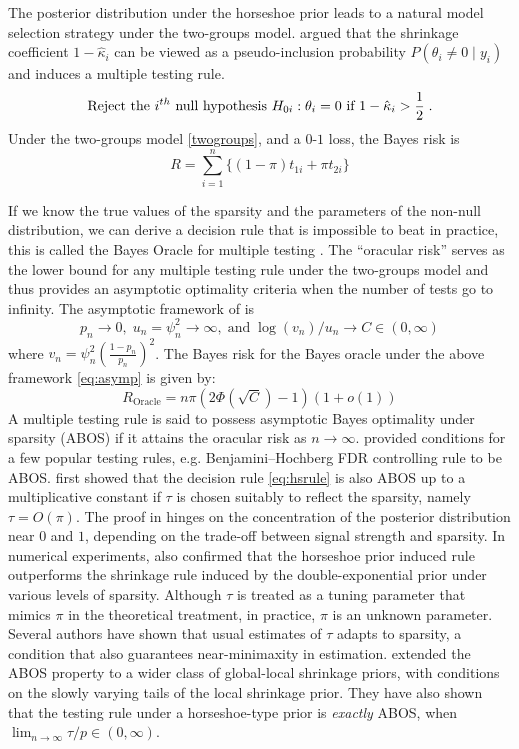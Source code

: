 \documentclass[11pt]{article}
\begin{document}
The posterior distribution under the horseshoe prior leads to a natural model
selection strategy under the two-groups model. \citet{carvalho2010horseshoe}
argued that the shrinkage coefficient $1-\hat{\kappa}_i$ can be viewed as
a pseudo-inclusion probability $P(\theta_i \ne 0 \mid y_i)$ and induces a
multiple testing rule.
\begin{equation}
  \text{Reject the $i^{th}$ null hypothesis } H_{0i} : \theta_i = 0 \text{ if }
  1-\hat{\kappa}_i > \frac{1}{2} \;. 
  \label{eq:hsrule}
\end{equation}
Under the two-groups model \eqref{twogroups}, and a $0$-$1$ loss, the Bayes risk is 
\[
R = \sum_{i=1}^{n} \{ (1- \pi) t_{1i} + \pi t_{2i} \}
\]

If we know the true values of the sparsity and the parameters of the non-null
distribution, we can derive a decision rule that is impossible to beat in
practice, this is called the Bayes Oracle for multiple testing
\citep{bogdan2011asymptotic}. The ``oracular risk'' serves as the lower bound
for any multiple testing rule under the two-groups model and thus provides an
asymptotic optimality criteria when the number of tests go to infinity. The
asymptotic framework of \citet{bogdan2011asymptotic} is 
\begin{equation}
p_n \to 0, \; u_n = \psi_n^2 \to \infty, \; \text{and} \; \log(v_n)/u_n \to C \in (0,\infty) \label{eq:asymp}
\end{equation}
where $v_n = \psi_n^2 (\frac{1-p_n}{p_n})^2$. The Bayes risk for the Bayes oracle under the above framework \eqref{eq:asymp} is given by:
\[
R_{\text{Oracle}} = n \pi (2 \Phi(\sqrt{C}) - 1)(1+o(1))
\]
A multiple testing rule is said to possess asymptotic Bayes optimality under
sparsity (ABOS) if it attains the oracular risk as $n \to \infty$.
\citet{bogdan2011asymptotic} provided conditions for a few popular testing
rules, e.g. Benjamini--Hochberg FDR controlling rule to be ABOS.
\citet{datta2013asymptotic} first showed that the decision rule
\eqref{eq:hsrule} is also ABOS up to a multiplicative constant if $\tau$ is
chosen suitably to reflect the sparsity, namely $\tau = O(\pi)$.
The proof in \citet{datta2013asymptotic} hinges on the concentration of the posterior
distribution near $0$ and $1$, depending on the trade-off between signal
strength and sparsity.  In numerical experiments,
\citet{datta2013asymptotic} also confirmed that the horseshoe prior
induced rule outperforms the shrinkage rule induced by the double-exponential
prior under various levels of sparsity. 
Although $\tau$ is treated as a tuning parameter that mimics $\pi$ in the
theoretical treatment, in practice, $\pi$ is an unknown parameter. Several
authors \cite{datta2013asymptotic, ghosh2016asymptotic,
ghosh2016testing,van2016many} have shown that usual estimates of $\tau$ adapts
to sparsity, a condition that also guarantees near-minimaxity in estimation.
\citet{ghosh2016testing} extended the ABOS property to a wider class of
global-local shrinkage priors, with conditions on the slowly varying tails of
the local shrinkage prior. They have also shown that the testing rule under a
horseshoe-type prior is \textit{exactly} ABOS, when $\lim_{n \to \infty} \tau/p
\in (0, \infty)$. 
\end{document}
